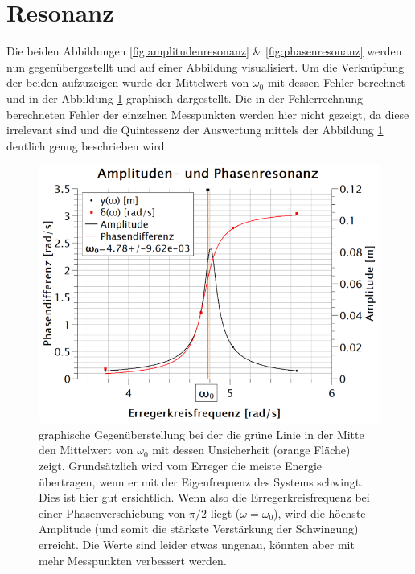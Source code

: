 \section{Resonanz}
Die beiden Abbildungen \ref{fig:amplitudenresonanz} \& \ref{fig:phasenresonanz} werden nun gegenübergestellt und auf einer Abbildung visualisiert. Um die Verknüpfung der beiden aufzuzeigen wurde der Mittelwert von $\omega_{0}$ mit dessen Fehler berechnet und in der Abbildung \ref{fig:resonanz} graphisch dargestellt. Die in der Fehlerrechnung berechneten Fehler der einzelnen Messpunkten werden hier nicht gezeigt, da diese irrelevant sind und die Quintessenz der Auswertung mittels der Abbildung \ref{fig:resonanz} deutlich genug beschrieben wird.
\begin{figure}[h]
\centering
\includegraphics[scale=1.25]{Bilder/resultat_amp_phasresonanz.png} 
\caption{graphische Gegenüberstellung bei der die grüne Linie in der Mitte den Mittelwert von $\omega_{0}$ mit dessen Unsicherheit (orange Fläche) zeigt. Grundsätzlich wird vom Erreger die meiste Energie übertragen, wenn er mit der Eigenfrequenz des Systems schwingt. Dies ist hier gut ersichtlich. Wenn also die Erregerkreisfrequenz bei einer Phasenverschiebung von $\pi/2$ liegt ($\omega=\omega_{0}$), wird die höchste Amplitude (und somit die stärkste Verstärkung der Schwingung) erreicht. Die Werte sind leider etwas ungenau, könnten aber mit mehr Messpunkten verbessert werden.}
\label{fig:resonanz}
\end{figure}






































